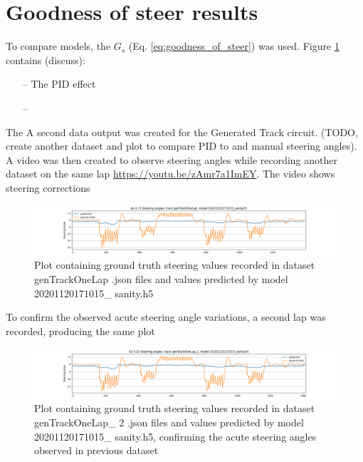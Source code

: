 \section{Goodness of steer results}

To compare models, the $G_s$ (Eq. \ref{eq:goodness_of_steer}) was used. Figure  \ref{fig:genTrackOneLap_20201120171015_sanity_gos} contains (discuss):
\begin{itemize}
    \item[--] The PID effect
    \item[--] 
\end{itemize}
The
A second data output was created for the Generated Track circuit. (TODO, create another dataset and plot to compare PID to and manual steering angles).
A video was then created to observe steering angles while recording another dataset on the same lap \href{https://youtu.be/zAmr7a1ImEY}{https://youtu.be/zAmr7a1ImEY}. The video shows steering corrections



\begin{figure}[ht]
 \centering 
 \includegraphics[width=\textwidth]{Figures/sa_genTrackOneLap_20201120171015_sanity.h5.png}
 \caption{Plot containing ground truth steering values recorded in dataset genTrackOneLap .json files and values predicted by model 20201120171015\_ sanity.h5}
 \label{fig:genTrackOneLap_20201120171015_sanity_gos} 
\end{figure}

To confirm the observed acute steering angle variations, a second lap was recorded, producing the same plot
 \label{fig:a_genTrackOneLap_2_20201120171015_sanity} 

\begin{figure}[ht]
 \centering 
 \includegraphics[width=\textwidth]{Figures/sa_genTrackOneLap_2_20201120171015_sanity.h5.png}
 \caption{Plot containing ground truth steering values recorded in dataset genTrackOneLap\_ 2 .json files and values predicted by model 20201120171015\_ sanity.h5, confirming the acute steering angles observed in previous dataset}
 \label{fig:a_genTrackOneLap_2_20201120171015_sanity} 
\end{figure}

